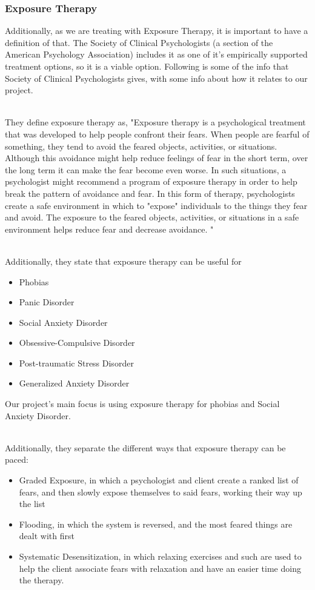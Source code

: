 \documentclass[a4paper,10pt]{article}
\begin{document}
\subsubsection{Exposure Therapy}
Additionally, as we are treating with Exposure Therapy, it is important to have a definition of that.  The Society of Clinical Psychologists (a section of the American Psychology 
Association) includes it as one of it's empirically supported treatment options, so it is a viable option.  Following is some of the info that Society of Clinical Psychologists gives,
with some info about how it relates to our project.
\par~\\ 
They define exposure therapy as, "Exposure therapy is a psychological treatment that was developed to help people confront their fears. When people
are fearful of something, they tend to avoid the feared objects, activities, or situations. Although this avoidance might help reduce feelings of fear in the short term, over the long 
term it can make the fear become even worse. In such situations, a psychologist might recommend a program of exposure therapy in order to help break the pattern of avoidance and fear.
In this form of therapy, psychologists create a safe environment in which to "expose" individuals to the things they fear and avoid. The exposure to the feared objects, activities, or 
situations in a safe environment helps reduce fear and decrease avoidance. "
\par~\\ 
Additionally, they state that exposure therapy can be useful for 
\begin{itemize}
	\item Phobias
	\item Panic Disorder
	\item Social Anxiety Disorder
	\item Obsessive-Compulsive Disorder
	\item Post-traumatic Stress Disorder
	\item Generalized Anxiety Disorder 
\end{itemize}
Our project's main focus is using exposure therapy for phobias and Social Anxiety Disorder.  
\par~\\ 
Additionally, they separate the different ways that exposure therapy can be paced:
\begin{itemize}
	\item Graded Exposure, in which a psychologist and client create a ranked list of fears, and then slowly expose themselves to said fears, working their way up the list
	\item Flooding, in which the system is reversed, and the most feared things are dealt with first
	\item Systematic Desensitization, in which relaxing exercises and such are used to help the client associate fears with relaxation and have an easier time doing the therapy.
\end{itemize}
\end{document}
